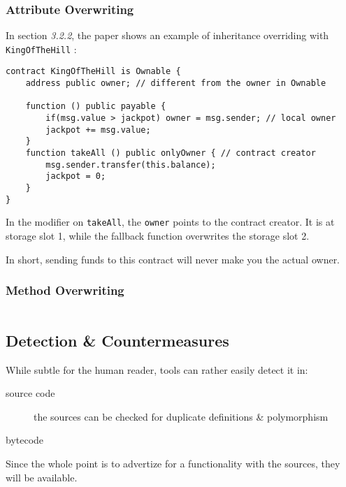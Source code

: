 \subsubsection{Attribute Overwriting}

In section \emph{3.2.2}, the paper \cite{paper-art-of-the-scam} shows an example of inheritance overriding with \lstinline{KingOfTheHill} :

\begin{lstlisting}[language=Solidity]
contract KingOfTheHill is Ownable {
    address public owner; // different from the owner in Ownable

    function () public payable {
        if(msg.value > jackpot) owner = msg.sender; // local owner
        jackpot += msg.value;
    }
    function takeAll () public onlyOwner { // contract creator
        msg.sender.transfer(this.balance);
        jackpot = 0;
    }
}
\end{lstlisting}

In the modifier on \lstinline{takeAll}, the \lstinline{owner} points to the contract creator.
It is at storage slot 1, while the fallback function overwrites the storage slot 2.

In short, sending funds to this contract will never make you the actual owner.

\subsubsection{Method Overwriting}

\begin{lstlisting}[language=Solidity]

\end{lstlisting}

\newpage
\subsection{Detection \& Countermeasures}

While subtle for the human reader, tools can rather easily detect it in:

\begin{description}
\item[source code]{the sources can be checked for duplicate definitions \& polymorphism}
\item[bytecode]{}
\end{description}

Since the whole point is to advertize for a functionality with the sources, they will be available.
